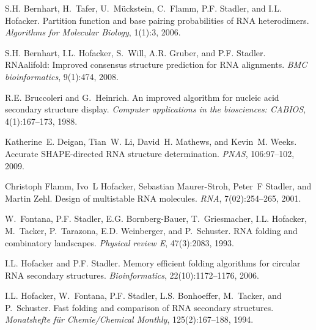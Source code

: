 
\begin{DoxyDescription}
\item[\label{_CITEREF_bernhart:2006}%
\mbox{[}1\mbox{]}]S.\+H. Bernhart, H.~Tafer, U.~M\"{u}ckstein, C.~Flamm, P.\+F. Stadler, and I.\+L. Hofacker. Partition function and base pairing probabilities of R\+NA heterodimers. {\itshape Algorithms for Molecular Biology}, 1(1)\+:3, 2006.


\item[\label{_CITEREF_bernhart:2008}%
\mbox{[}2\mbox{]}]S.\+H. Bernhart, I.\+L. Hofacker, S.~Will, A.\+R. Gruber, and P.\+F. Stadler. R\+N\+Aalifold\+: Improved consensus structure prediction for R\+NA alignments. {\itshape B\+MC bioinformatics}, 9(1)\+:474, 2008.


\item[\label{_CITEREF_bruccoleri:1988}%
\mbox{[}3\mbox{]}]R.\+E. Bruccoleri and G.~Heinrich. An improved algorithm for nucleic acid secondary structure display. {\itshape Computer applications in the biosciences\+: C\+A\+B\+I\+OS}, 4(1)\+:167--173, 1988.


\item[\label{_CITEREF_deigan:2009}%
\mbox{[}4\mbox{]}]Katherine~E. Deigan, Tian~W. Li, David~H. Mathews, and Kevin~M. Weeks. Accurate S\+H\+A\+P\+E-\/directed R\+NA structure determination. {\itshape P\+N\+AS}, 106\+:97--102, 2009.


\item[\label{_CITEREF_flamm:2001}%
\mbox{[}5\mbox{]}]Christoph Flamm, Ivo~L Hofacker, Sebastian Maurer-\/\+Stroh, Peter~F Stadler, and Martin Zehl. Design of multistable R\+NA molecules. {\itshape R\+NA}, 7(02)\+:254--265, 2001.


\item[\label{_CITEREF_fontana:1993b}%
\mbox{[}6\mbox{]}]W.~Fontana, P.\+F. Stadler, E.\+G. Bornberg-\/\+Bauer, T.~Griesmacher, I.\+L. Hofacker, M.~Tacker, P.~Tarazona, E.\+D. Weinberger, and P.~Schuster. R\+NA folding and combinatory landscapes. {\itshape Physical review E}, 47(3)\+:2083, 1993.


\item[\label{_CITEREF_hofacker:2006}%
\mbox{[}7\mbox{]}]I.\+L. Hofacker and P.\+F. Stadler. Memory efficient folding algorithms for circular R\+NA secondary structures. {\itshape Bioinformatics}, 22(10)\+:1172--1176, 2006.


\item[\label{_CITEREF_hofacker:1994}%
\mbox{[}8\mbox{]}]I.\+L. Hofacker, W.~Fontana, P.\+F. Stadler, L.\+S. Bonhoeffer, M.~Tacker, and P.~Schuster. Fast folding and comparison of R\+NA secondary structures. {\itshape Monatshefte f\"{u}r Chemie/\+Chemical Monthly}, 125(2)\+:167--188, 1994.



\end{DoxyDescription}
